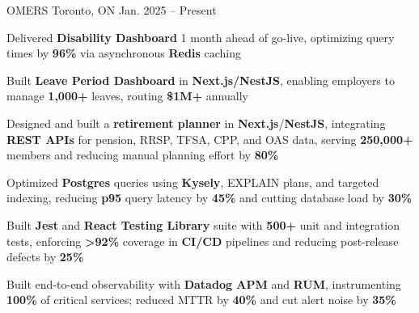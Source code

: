 \documentclass[11pt, a4paper]{awesome-cv}
\begin{document}
\makecvheader[C]


\begin{cventries}


  \cventry
    {\color{lightblue}{ASSOCIATE FULL-STACK ENGINEER}}
    {OMERS}
    {Toronto, ON}
    {Jan. 2025 -- Present}
    {
      \begin{cvitems}
        \item{Delivered \textbf{Disability Dashboard} 1 month ahead of go-live, optimizing query times by \textbf{96\%} via asynchronous \textbf{Redis} caching}
        \item{Built \textbf{Leave Period Dashboard} in \textbf{Next.js/NestJS}, enabling employers to manage \textbf{1,000+} leaves, routing \textbf{\$1M+} annually}
        \item{Designed and built a \textbf{retirement planner} in \textbf{Next.js}/\textbf{NestJS}, integrating \textbf{REST APIs} for pension, RRSP, TFSA, CPP, and OAS data, serving \textbf{250,000+} members and reducing manual planning effort by \textbf{80\%}}
        \item{Optimized \textbf{Postgres} queries using \textbf{Kysely}, EXPLAIN plans, and targeted indexing, reducing \textbf{p95} query latency by \textbf{45\%} and cutting database load by \textbf{30\%}}
        \item{Built \textbf{Jest} and \textbf{React Testing Library} suite with \textbf{500+} unit and integration tests, enforcing \textbf{>92\%} coverage in \textbf{CI/CD} pipelines and reducing post-release defects by \textbf{25\%}}
        \item{Built end-to-end observability with \textbf{Datadog APM} and \textbf{RUM}, instrumenting \textbf{100\%} of critical services; reduced MTTR by \textbf{40\%} and cut alert noise by \textbf{35\%}}
      \end{cvitems}
    }

  \vspace{3mm}


\end{cventries}
\end{document}

